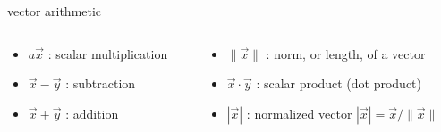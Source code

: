 \begin{frame}[fragile]{vector arithmetic}
\begin{columns}
 \begin{column}{0.5\linewidth}
  \begin{itemize}
   \item $a\vec{x}$ : scalar multiplication
   \item $\vec{x} - \vec{y}$ : subtraction
   \item $\vec{x} + \vec{y}$ : addition
  \end{itemize}
  \end{column}
  \pause

  \begin{column}{0.5\linewidth}
  \begin{itemize}
   \item $\|\vec{x}\|$ : norm, or length, of a vector
   \item $\vec{x} \cdot \vec{y}$ : scalar product (dot product)
   \item $|\vec{x}|$ : normalized vector $|\vec{x}| = \vec{x}/\|\vec{x}\|$
  \end{itemize}
  \end{column}
 \end{columns}

\vspace{40pt}


\end{frame}


